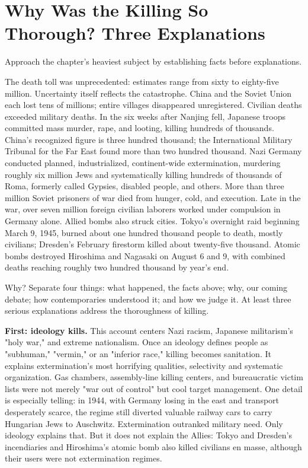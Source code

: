 \section[Thorough Killing: Three Explanations]{Why Was the Killing So Thorough? Three Explanations}
Approach the chapter's heaviest subject by establishing facts before explanations.

The death toll was unprecedented: estimates range from sixty to eighty-five million. Uncertainty itself reflects the catastrophe. China and the Soviet Union each lost tens of millions; entire villages disappeared unregistered. Civilian deaths exceeded military deaths. In the six weeks after Nanjing fell, Japanese troops committed mass murder, rape, and looting, killing hundreds of thousands. China's recognized figure is three hundred thousand; the International Military Tribunal for the Far East found more than two hundred thousand. Nazi Germany conducted planned, industrialized, continent-wide extermination, murdering roughly six million Jews and systematically killing hundreds of thousands of Roma, formerly called Gypsies, disabled people, and others. More than three million Soviet prisoners of war died from hunger, cold, and execution. Late in the war, over seven million foreign civilian laborers worked under compulsion in Germany alone. Allied bombs also struck cities. Tokyo's overnight raid beginning March 9, 1945, burned about one hundred thousand people to death, mostly civilians; Dresden's February firestorm killed about twenty-five thousand. Atomic bombs destroyed Hiroshima and Nagasaki on August 6 and 9, with combined deaths reaching roughly two hundred thousand by year's end.

Why? Separate four things: what happened, the facts above; why, our coming debate; how contemporaries understood it; and how we judge it. At least three serious explanations address the thoroughness of killing.

\textbf{First: ideology kills.} This account centers Nazi racism, Japanese militarism's "holy war," and extreme nationalism. Once an ideology defines people as "subhuman," "vermin," or an "inferior race," killing becomes sanitation. It explains extermination's most horrifying qualities, selectivity and systematic organization. Gas chambers, assembly-line killing centers, and bureaucratic victim lists were not merely "war out of control" but cool target management. One detail is especially telling: in 1944, with Germany losing in the east and transport desperately scarce, the regime still diverted valuable railway cars to carry Hungarian Jews to Auschwitz. Extermination outranked military need. Only ideology explains that. But it does not explain the Allies: Tokyo and Dresden's incendiaries and Hiroshima's atomic bomb also killed civilians en masse, although their users were not extermination regimes.


